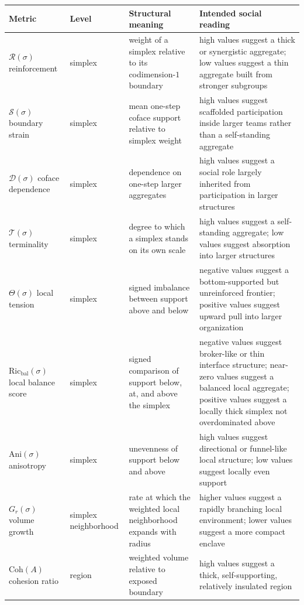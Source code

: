 \documentclass[11pt]{article}
\newcommand{\Ric}{\mathrm{Ric}}
\begin{document}
\begin{table}[ht]
\centering
\scriptsize
\begin{tabular}{>{\raggedright\arraybackslash}p{} >{\raggedright\arraybackslash}p{} >{\raggedright\arraybackslash}p{} >{\raggedright\arraybackslash}p{}}
\toprule
Metric & Level & Structural meaning & Intended social reading \\
\midrule
$\mathcal{R}(\sigma)$ reinforcement & simplex & weight of a simplex relative to its codimension-$1$ boundary & high values suggest a thick or synergistic aggregate; low values suggest a thin aggregate built from stronger subgroups \\
$\mathcal{S}(\sigma)$ boundary strain & simplex & mean one-step coface support relative to simplex weight & high values suggest scaffolded participation inside larger teams rather than a self-standing aggregate \\
$\mathcal{D}(\sigma)$ coface dependence & simplex & dependence on one-step larger aggregates & high values suggest a social role largely inherited from participation in larger structures \\
$\mathcal{T}(\sigma)$ terminality & simplex & degree to which a simplex stands on its own scale & high values suggest a self-standing aggregate; low values suggest absorption into larger structures \\
$\Theta(\sigma)$ local tension & simplex & signed imbalance between support above and below & negative values suggest a bottom-supported but unreinforced frontier; positive values suggest upward pull into larger organization \\
$\Ric_{\mathrm{bal}}(\sigma)$ local balance score & simplex & signed comparison of support below, at, and above the simplex & negative values suggest broker-like or thin interface structure; near-zero values suggest a balanced local aggregate; positive values suggest a locally thick simplex not overdominated above \\
$\mathrm{Ani}(\sigma)$ anisotropy & simplex & unevenness of support below and above & high values suggest directional or funnel-like local structure; low values suggest locally even support \\
$G_r(\sigma)$ volume growth & simplex neighborhood & rate at which the weighted local neighborhood expands with radius & higher values suggest a rapidly branching local environment; lower values suggest a more compact enclave \\
$\mathrm{Coh}(A)$ cohesion ratio & region & weighted volume relative to exposed boundary & high values suggest a thick, self-supporting, relatively insulated region \\

\end{tabular}
\end{table}
\end{document}
